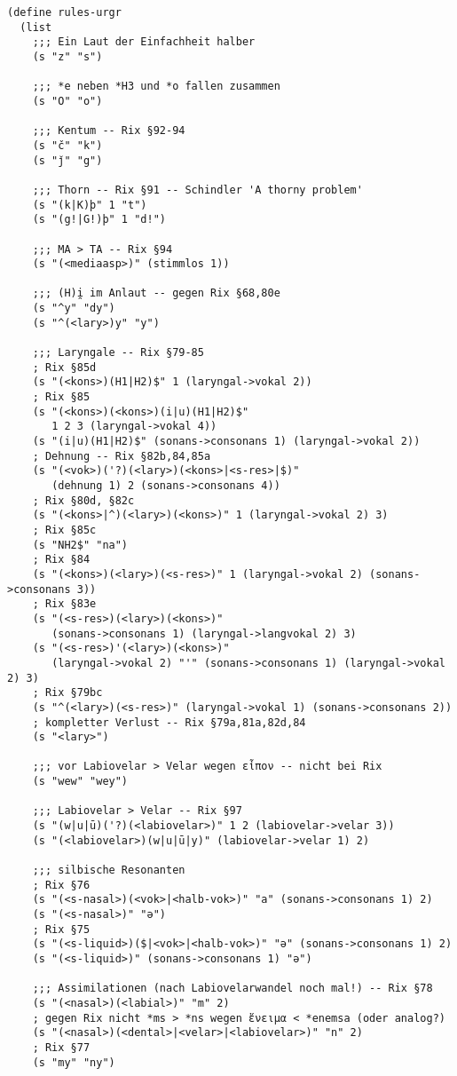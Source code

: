 \begin{verbatim}
(define rules-urgr
  (list
    ;;; Ein Laut der Einfachheit halber
    (s "z" "s")

    ;;; *e neben *H3 und *o fallen zusammen
    (s "O" "o")

    ;;; Kentum -- Rix §92-94
    (s "č" "k")
    (s "ǰ" "g")

    ;;; Thorn -- Rix §91 -- Schindler 'A thorny problem'
    (s "(k|K)þ" 1 "t")
    (s "(g!|G!)þ" 1 "d!")

    ;;; MA > TA -- Rix §94
    (s "(<mediaasp>)" (stimmlos 1))

    ;;; (H)i̯ im Anlaut -- gegen Rix §68,80e
    (s "^y" "dy")
    (s "^(<lary>)y" "y")

    ;;; Laryngale -- Rix §79-85
    ; Rix §85d
    (s "(<kons>)(H1|H2)$" 1 (laryngal->vokal 2))
    ; Rix §85
    (s "(<kons>)(<kons>)(i|u)(H1|H2)$"
       1 2 3 (laryngal->vokal 4))
    (s "(i|u)(H1|H2)$" (sonans->consonans 1) (laryngal->vokal 2))
    ; Dehnung -- Rix §82b,84,85a
    (s "(<vok>)('?)(<lary>)(<kons>|<s-res>|$)"
       (dehnung 1) 2 (sonans->consonans 4))
    ; Rix §80d, §82c
    (s "(<kons>|^)(<lary>)(<kons>)" 1 (laryngal->vokal 2) 3)
    ; Rix §85c
    (s "NH2$" "na")
    ; Rix §84
    (s "(<kons>)(<lary>)(<s-res>)" 1 (laryngal->vokal 2) (sonans->consonans 3))
    ; Rix §83e
    (s "(<s-res>)(<lary>)(<kons>)"
       (sonans->consonans 1) (laryngal->langvokal 2) 3)
    (s "(<s-res>)'(<lary>)(<kons>)"
       (laryngal->vokal 2) "'" (sonans->consonans 1) (laryngal->vokal 2) 3)
    ; Rix §79bc
    (s "^(<lary>)(<s-res>)" (laryngal->vokal 1) (sonans->consonans 2))
    ; kompletter Verlust -- Rix §79a,81a,82d,84
    (s "<lary>")

    ;;; vor Labiovelar > Velar wegen εἶπον -- nicht bei Rix
    (s "wew" "wey")

    ;;; Labiovelar > Velar -- Rix §97
    (s "(w|u|ū)('?)(<labiovelar>)" 1 2 (labiovelar->velar 3))
    (s "(<labiovelar>)(w|u|ū|y)" (labiovelar->velar 1) 2)

    ;;; silbische Resonanten
    ; Rix §76
    (s "(<s-nasal>)(<vok>|<halb-vok>)" "a" (sonans->consonans 1) 2)
    (s "(<s-nasal>)" "ə")
    ; Rix §75
    (s "(<s-liquid>)($|<vok>|<halb-vok>)" "ə" (sonans->consonans 1) 2)
    (s "(<s-liquid>)" (sonans->consonans 1) "ə")

    ;;; Assimilationen (nach Labiovelarwandel noch mal!) -- Rix §78
    (s "(<nasal>)(<labial>)" "m" 2)
    ; gegen Rix nicht *ms > *ns wegen ἔνειμα < *enemsa (oder analog?)
    (s "(<nasal>)(<dental>|<velar>|<labiovelar>)" "n" 2)
    ; Rix §77
    (s "my" "ny")


\end{verbatim}
